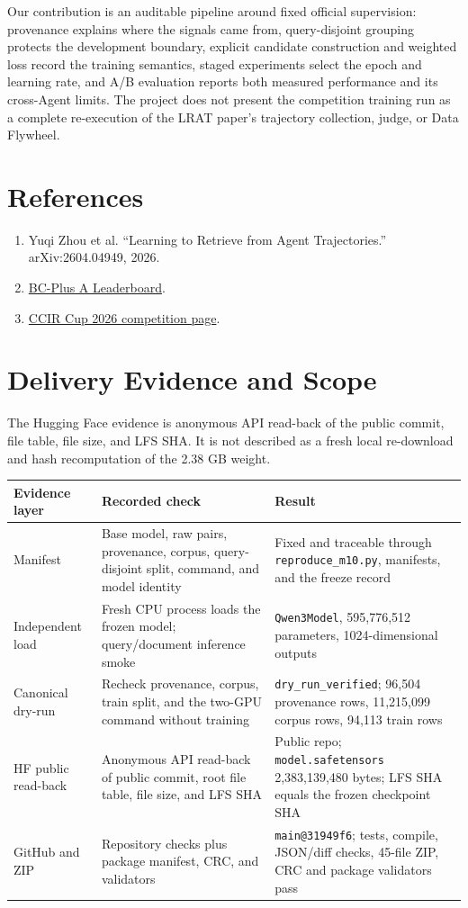 \documentclass[10pt,a4paper]{article}
\begin{document}
Our contribution is an auditable pipeline around fixed official supervision: provenance explains where the signals came from, query-disjoint grouping protects the development boundary, explicit candidate construction and weighted loss record the training semantics, staged experiments select the epoch and learning rate, and A/B evaluation reports both measured performance and its cross-Agent limits. The project does not present the competition training run as a complete re-execution of the LRAT paper's trajectory collection, judge, or Data Flywheel.

\section*{References}
\small
\begin{enumerate}
\item Yuqi Zhou et al. ``Learning to Retrieve from Agent Trajectories.'' arXiv:2604.04949, 2026.
\item \href{https://huggingface.co/spaces/Yuqi-Zhou/BC-Plus-Leaderboard}{BC-Plus A Leaderboard}.
\item \href{https://www.xir.cn/competition/1170}{CCIR Cup 2026 competition page}.
\end{enumerate}

\appendix
\section{Delivery Evidence and Scope}
The Hugging Face evidence is anonymous API read-back of the public commit, file table, file size, and LFS SHA. It is not described as a fresh local re-download and hash recomputation of the 2.38 GB weight.

\begin{center}
\small
\begin{tabularx}{0.97\textwidth}{p{}p{}Y}
\toprule
Evidence layer & Recorded check & Result \\
\midrule
Manifest & Base model, raw pairs, provenance, corpus, query-disjoint split, command, and model identity & Fixed and traceable through \texttt{reproduce\_m10.py}, manifests, and the freeze record \\
Independent load & Fresh CPU process loads the frozen model; query/document inference smoke & \texttt{Qwen3Model}, 595,776,512 parameters, 1024-dimensional outputs \\
Canonical dry-run & Recheck provenance, corpus, train split, and the two-GPU command without training & \texttt{dry\_run\_verified}; 96,504 provenance rows, 11,215,099 corpus rows, 94,113 train rows \\
HF public read-back & Anonymous API read-back of public commit, root file table, file size, and LFS SHA & Public repo; \texttt{model.safetensors} 2,383,139,480 bytes; LFS SHA equals the frozen checkpoint SHA \\
GitHub and ZIP & Repository checks plus package manifest, CRC, and validators & \texttt{main@31949f6}; tests, compile, JSON/diff checks, 45-file ZIP, CRC and package validators pass \\
\bottomrule
\end{tabularx}
\end{center}
\end{document}

